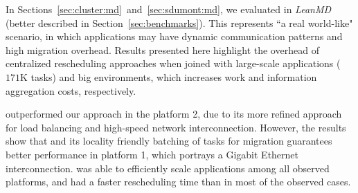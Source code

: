 
In Sections~\ref{sec:cluster:md}~and~\ref{sec:sdumont:md}, we evaluated \packdrop in \textit{LeanMD} (better described in Section~\ref{sec:benchmarks}).
This represents ``a real world-like" scenario, in which applications may have dynamic communication patterns and high migration overhead.
Results presented here highlight the overhead of centralized rescheduling approaches when joined with large-scale applications ($171$K tasks) and big environments, which increases work and information aggregation costs, respectively.

\distributedlb outperformed our approach in the platform 2, due to its more refined approach for load balancing and high-speed network interconnection.
However, the results show that \packdrop and its locality friendly batching of tasks for migration guarantees better performance in platform 1, which portrays a Gigabit Ethernet interconnection.
\packdrop was able to efficiently scale applications among all observed platforms, and had a faster rescheduling time than \distributedlb in most of the observed cases.
